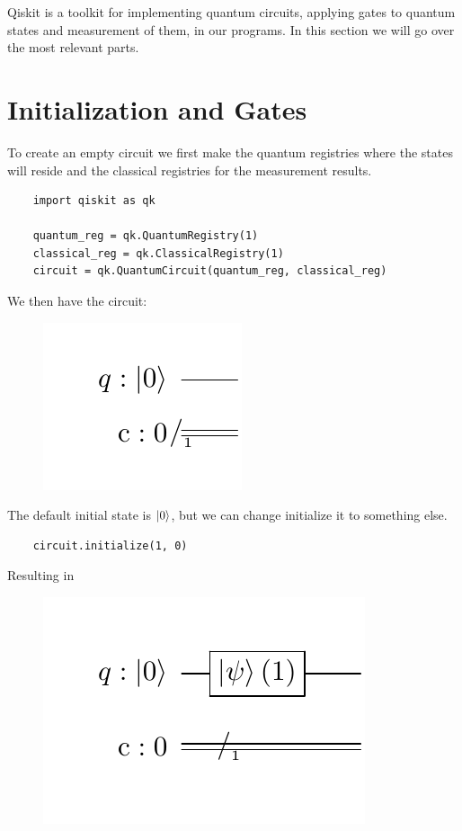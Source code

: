 Qiskit is a toolkit for implementing quantum circuits, applying gates to quantum states and measurement of them, in our programs. In this section we will go over the most relevant parts.

\section{Initialization and Gates}

To create an empty circuit we first make the quantum registries where the states will reside and the classical registries for the measurement results.

\begin{verbatim}
    import qiskit as qk

    quantum_reg = qk.QuantumRegistry(1)
    classical_reg = qk.ClassicalRegistry(1)
    circuit = qk.QuantumCircuit(quantum_reg, classical_reg)
\end{verbatim}

We then have the circuit:

\begin{figure}[H]
    \centering
    \includegraphics{Figures/Circuits/implementation/1zero.pdf}
\end{figure}

The default initial state is $\ket{0}$, but we can change initialize it to something else.

\begin{verbatim}
    circuit.initialize(1, 0)
\end{verbatim}

Resulting in

\begin{figure}[H]
    \centering
    \includegraphics{Figures/Circuits/implementation/init1.pdf}
\end{figure}

